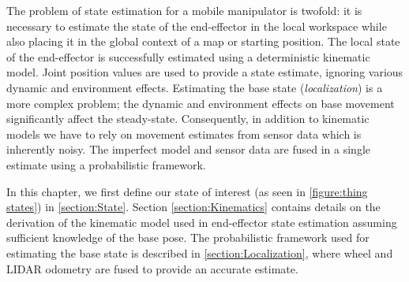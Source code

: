 \documentclass[times, utf8, diplomski, english]{fer}
\begin{document}
The problem of state estimation for a mobile manipulator is twofold: it is necessary to estimate the state of the end-effector in the local workspace while also placing it in the global context of a map or starting position.
The local state of the end-effector is successfully estimated using a deterministic kinematic model.
Joint position values are used to provide a state estimate, ignoring various dynamic and environment effects.
Estimating the base state (\textit{localization}) is a more complex problem; the dynamic and environment effects on base movement significantly affect the steady-state.
Consequently, in addition to kinematic models we have to rely on movement estimates from sensor data which is inherently noisy.
The imperfect model and sensor data are fused in a single estimate using a probabilistic framework.

In this chapter, we first define our state of interest (as seen in \autoref{figure:thing states}) in \autoref{section:State}. 
Section \ref{section:Kinematics} contains details on the derivation of the kinematic model used in end-effector state estimation assuming sufficient knowledge of the base pose. 
The probabilistic framework used for estimating the base state is described in \autoref{section:Localization}, where wheel and LIDAR odometry are fused to provide an accurate estimate.
\end{document}
